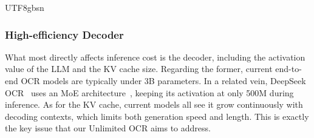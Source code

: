 \documentclass[11pt, a4paper, logo, copyright, nonumbering]{deepseek}
\begin{document}
\begin{CJK*}{UTF8}{gbsn}
\subsubsection{High-efficiency Decoder}
What most directly affects inference cost is the decoder, including the activation value of the LLM and the KV cache size. Regarding the former, current end-to-end OCR models are typically under 3B parameters. In a related vein, DeepSeek OCR~\cite{wei2025deepseek} uses an MoE architecture~\cite{deepseek32}, keeping its activation at only 500M during inference. As for the KV cache, current models all see it grow continuously with decoding contexts, which limits both generation speed and length. This is exactly the key issue that our Unlimited OCR aims to address.









\end{CJK*}
\end{document}
